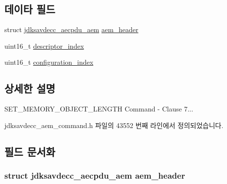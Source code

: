 \subsection*{데이타 필드}
\begin{DoxyCompactItemize}
\item 
struct \hyperlink{structjdksavdecc__aecpdu__aem}{jdksavdecc\+\_\+aecpdu\+\_\+aem} \hyperlink{structjdksavdecc__aem__command__get__memory__object__length_ae1e77ccb75ff5021ad923221eab38294}{aem\+\_\+header}
\item 
uint16\+\_\+t \hyperlink{structjdksavdecc__aem__command__get__memory__object__length_a042bbc76d835b82d27c1932431ee38d4}{descriptor\+\_\+index}
\item 
uint16\+\_\+t \hyperlink{structjdksavdecc__aem__command__get__memory__object__length_afaad1bd7c66f9611e134d8c5ce98f444}{configuration\+\_\+index}
\end{DoxyCompactItemize}


\subsection{상세한 설명}
S\+E\+T\+\_\+\+M\+E\+M\+O\+R\+Y\+\_\+\+O\+B\+J\+E\+C\+T\+\_\+\+L\+E\+N\+G\+TH Command -\/ Clause 7... 

jdksavdecc\+\_\+aem\+\_\+command.\+h 파일의 43552 번째 라인에서 정의되었습니다.



\subsection{필드 문서화}
\subsubsection[{\texorpdfstring{aem\+\_\+header}{aem_header}}]{\setlength{\rightskip}{0pt plus 5cm}struct {\bf jdksavdecc\+\_\+aecpdu\+\_\+aem} aem\+\_\+header}\hypertarget{structjdksavdecc__aem__command__get__memory__object__length_ae1e77ccb75ff5021ad923221eab38294}{}\label{structjdksavdecc__aem__command__get__memory__object__length_ae1e77ccb75ff5021ad923221eab38294}


